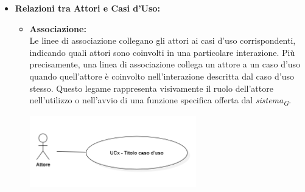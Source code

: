 \begin{itemize}
    \item \textbf{Relazioni tra Attori e Casi d'Uso:}
    \begin{itemize}
        \item \textbf{Associazione:} \\
        Le linee di associazione collegano gli attori ai casi d'uso corrispondenti, indicando quali attori sono coinvolti in una particolare interazione. Più precisamente, una linea di associazione collega un attore a un caso d'uso quando quell'attore è coinvolto nell'interazione descritta dal caso d'uso stesso. Questo legame rappresenta visivamente il ruolo dell'attore nell'utilizzo o nell'avvio di una funzione specifica offerta dal \textit{sistema}\textsubscript{\textit{G}}.
        \begin{minipage}[t]{\linewidth}
            \centering
            \includegraphics[width=0.6\textwidth]{../Images/NormeDiProgetto/Associazione.PNG}
        \end{minipage}
    \end{itemize}


\end{itemize}
